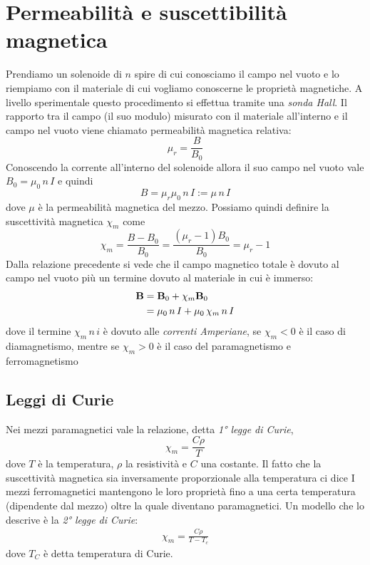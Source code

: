 \section{Permeabilità e suscettibilità magnetica}
Prendiamo un solenoide di $ n $ spire di cui conosciamo il campo nel vuoto e lo riempiamo con il materiale di cui vogliamo conoscerne le
proprietà magnetiche. A livello sperimentale questo procedimento si effettua tramite una \textit{sonda Hall}.
Il rapporto tra il campo (il suo modulo) misurato con il materiale all'interno e il campo nel vuoto viene chiamato permeabilità magnetica relativa:
\begin{equation}
  \mu_r = \frac{B}{B_0}
\end{equation}
Conoscendo la corrente all'interno del solenoide allora il suo campo nel vuoto vale $ B_0 = \mu_0 \, n \, I $ e quindi
\begin{equation}
  B = \mu_r \mu_0 \, n \, I := \mu \, n \,I
\end{equation}
dove $ \mu $ è la permeabilità magnetica del mezzo. Possiamo quindi definire la suscettività magnetica $ \chi_m $ come
\begin{equation}
  \chi_m = \frac{B - B_0}{B_0} = \frac{\left( \mu_r - 1 \right) B_0}{B_0} = \mu_r -1
\end{equation}
Dalla relazione precedente si vede che il campo magnetico totale è dovuto al campo nel vuoto più un termine dovuto al materiale in cui è immerso:
\begin{align}
  \mathbf{ B } &= \mathbf{ B }_0 + \chi_m \mathbf{ B }_0
  \\
  &= \mu_0 \,n \,I + \mu_0 \,\chi_m \, n \,I
\end{align}
dove il termine $ \chi_m \, n \, i $ è dovuto alle \textit{correnti Amperiane}, se $ \chi_m < 0 $ è il caso di diamagnetismo, mentre se
$ \chi_m > 0 $ è il caso del paramagnetismo e ferromagnetismo

\subsection{Leggi di Curie}
Nei mezzi paramagnetici vale la relazione, detta \textit{1° legge di Curie},
\begin{equation}
  \chi_m = \frac{C \rho}{T}
\end{equation}
dove $ T $ è la temperatura, $ \rho $ la resistività e $ C $ una costante. Il fatto che la suscettività magnetica sia inversamente proporzionale alla 
temperatura ci dice 
I mezzi ferromagnetici mantengono le loro proprietà fino a una certa temperatura (dipendente dal mezzo) oltre la quale diventano paramagnetici. Un modello 
che lo descrive è la \textit{2° legge di Curie}:
\begin{align}
  \chi_m = \frac{C \rho}{T - T_c}
\end{align}
dove $ T_C $ è detta temperatura di Curie.
